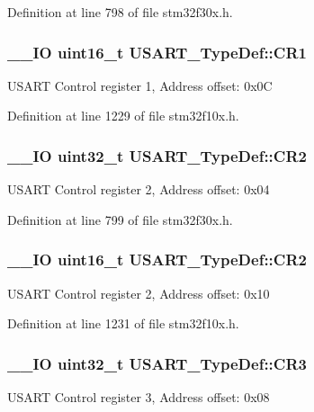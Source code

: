 Definition at line 798 of file stm32f30x.\-h.

\hypertarget{struct_u_s_a_r_t___type_def_a5de50313b1437f7f926093f00902d37a}{
\subsubsection[{C\-R1}]{\setlength{\rightskip}{0pt plus 5cm}\-\_\-\-\_\-\-I\-O {\bf uint16\-\_\-t} U\-S\-A\-R\-T\-\_\-\-Type\-Def\-::\-C\-R1}}\label{struct_u_s_a_r_t___type_def_a5de50313b1437f7f926093f00902d37a}
U\-S\-A\-R\-T Control register 1, Address offset\-: 0x0\-C 

Definition at line 1229 of file stm32f10x.\-h.

\hypertarget{struct_u_s_a_r_t___type_def_aa7ede2de6204c3fc4bd9fb328801c99a}{
\subsubsection[{C\-R2}]{\setlength{\rightskip}{0pt plus 5cm}\-\_\-\-\_\-\-I\-O {\bf uint32\-\_\-t} U\-S\-A\-R\-T\-\_\-\-Type\-Def\-::\-C\-R2}}\label{struct_u_s_a_r_t___type_def_aa7ede2de6204c3fc4bd9fb328801c99a}
U\-S\-A\-R\-T Control register 2, Address offset\-: 0x04 

Definition at line 799 of file stm32f30x.\-h.

\hypertarget{struct_u_s_a_r_t___type_def_a2a494156d185762e4596696796c393bc}{
\subsubsection[{C\-R2}]{\setlength{\rightskip}{0pt plus 5cm}\-\_\-\-\_\-\-I\-O {\bf uint16\-\_\-t} U\-S\-A\-R\-T\-\_\-\-Type\-Def\-::\-C\-R2}}\label{struct_u_s_a_r_t___type_def_a2a494156d185762e4596696796c393bc}
U\-S\-A\-R\-T Control register 2, Address offset\-: 0x10 

Definition at line 1231 of file stm32f10x.\-h.

\hypertarget{struct_u_s_a_r_t___type_def_af2991da9a4e1539530cd6b7b327199cc}{
\subsubsection[{C\-R3}]{\setlength{\rightskip}{0pt plus 5cm}\-\_\-\-\_\-\-I\-O {\bf uint32\-\_\-t} U\-S\-A\-R\-T\-\_\-\-Type\-Def\-::\-C\-R3}}\label{struct_u_s_a_r_t___type_def_af2991da9a4e1539530cd6b7b327199cc}
U\-S\-A\-R\-T Control register 3, Address offset\-: 0x08 

